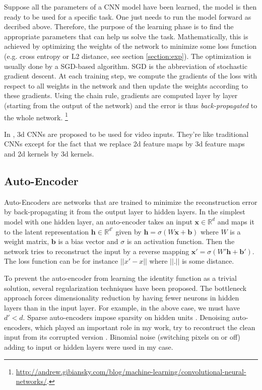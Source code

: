 Suppose all the parameters of a CNN model have been learned, the model
is then ready to be used for a specific task. One just needs to run the
model forward as decribed above. Therefore, the purpose of the learning
phase is to find the appropriate parameters that can help us solve the task.
Mathematically, this is achieved by optimizing the weights of the network
to minimize some loss function (e.g. cross entropy
or L2 distance, see section \ref{section:exp}).
The optimization is usually done by a SGD-based algorithm.
SGD is the abbreviation of stochastic gradient descent. At each
training step, we compute the gradients of the loss with respect to all
weights in the network and then update the weights according to these
gradients. Using the chain rule, gradients are computed layer by
layer (starting from the output of the network) and the error is thus
\textit{back-propagated} to the whole network.%
\footnote{
\href{http://andrew.gibiansky.com/blog/machine-learning/convolutional-neural-networks/}
{http://andrew.gibiansky.com/blog/machine-learning/convolutional-neural-networks/}.}

In \cite{S. Ji 2013}, 3d CNNs are proposed to be used for video inputs.
They're like traditional CNNs except for the fact that we replace
2d feature maps by 3d feature maps and 2d kernels by 3d kernels.

\subsection{Auto-Encoder} \label{subsection:AE}

Auto-Encoders are networks that are trained to minimize the reconstruction
error by back-propagating it from the output layer to hidden layers.
In the simplest model with one hidden layer, an auto-encoder takes an
input $\mathbf{x} \in \mathbb{R}^d$ and maps it to the latent
representation $\mathbf{h} \in \mathbb{R}^{d'}$ given by
$\mathbf{h} = \sigma(W\mathbf{x}+\mathbf{b})$ where $W$
is a weight matrix, $\mathbf{b}$ is a bias vector and $\sigma$ is an
activation function. Then the network tries to reconstruct the input
by a reverse mapping $\mathbf{x'} = \sigma(W'\mathbf{h}+\mathbf{b'})$.
The loss function can be for instance $||x' - x||$ where $||.||$ is
some distance.

To prevent the auto-encoder from learning the identity function as
a trivial solution, several regularization techniques have been proposed.
The bottleneck approach forces dimensionality reduction by having
fewer neurons in hidden layers than in the input layer. For example,
in the above case, we must have $d'<d$. Sparse auto-encoders impose sparsity
on hidden units \cite{A. Makhzani 2014}.
Denoising auto-encoders, which played an important role in my work,
try to recontruct the clean input from its corrupted version
\cite{P. Vincent 2008, Y. Bengio 2012}. Binomial noise
(switching pixels on or off) adding
to input or hidden layers were used in my case.

